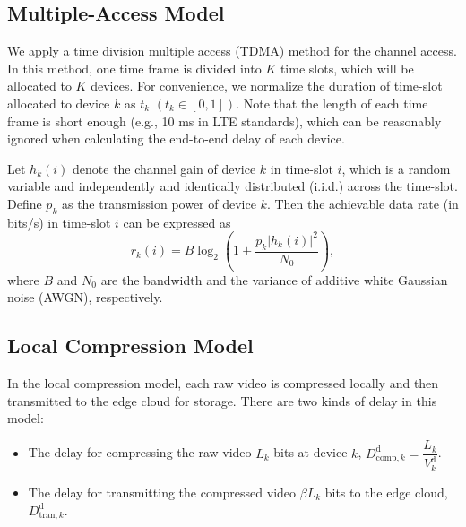 \documentclass[journal,draftcls,onecolumn,12pt,twoside]{IEEEtran}
\begin{document}
\subsection{Multiple-Access Model}
We apply a time division multiple access (TDMA) method for the channel access. In this method, one time frame is divided into $K$ time slots, which will be allocated to $K$ devices. For convenience, we normalize the duration of time-slot allocated to device $k$ as $t_k$ $\left(t_k \in [0, 1]\right)$. Note that the length of each time frame is short enough (e.g., 10 ms in LTE standards), which can be reasonably ignored when calculating the end-to-end delay of each device.

Let $h_k(i)$ denote the channel gain of device $k$ in time-slot $i$, which is a random variable and independently and identically distributed (i.i.d.) across the time-slot. Define $p_k$ as the transmission power of device $k$. Then the achievable data rate (in bits/s) in time-slot $i$ can be expressed as
\begin{equation}
    r_k(i) =  B \log_2 \left(1 + \frac{p_k \left|h_k(i)\right|^2}{N_0}\right), \label{1}
\end{equation}
where $B$ and $N_0$ are the bandwidth and the variance of additive white Gaussian noise (AWGN), respectively.

\subsection{Local Compression Model}
In the local compression model, each raw video is compressed locally and then transmitted to the edge cloud for storage. There are two kinds of delay in this model:
\begin{itemize}
	\item The delay for compressing the raw video $L_k$ bits at device $k$, $D_{\text{comp},k}^{\text{d}} = \dfrac{L_k}{V_k^{\text{d}}}$.
	\item The delay for transmitting the compressed video $\beta L_k$ bits to the edge cloud, $D_{\text{tran},k}^{\text{d}}$.
\end{itemize}
\end{document}
